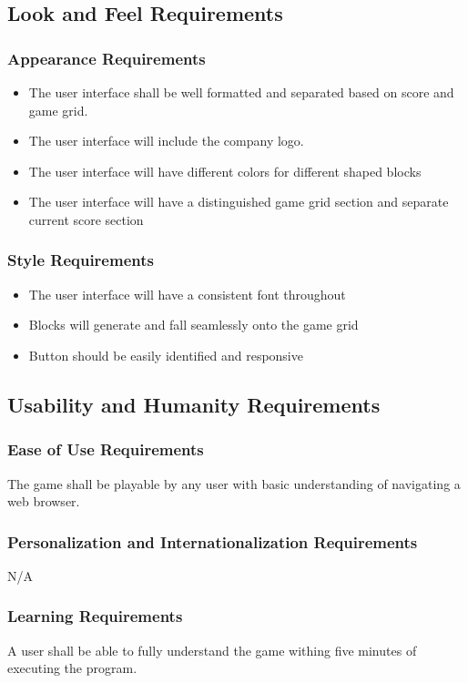 \documentclass[12pt, titlepage]{article}
\begin{document}
\subsection{Look and Feel Requirements}
\subsubsection{Appearance Requirements}
\begin{itemize}
\item The user interface shall be well formatted and separated based on score and game grid.
\item The user interface will include the company logo.
\item The user interface will have different colors for different shaped blocks
\item The user interface will have a distinguished game grid section and separate current score section
\end{itemize}
\subsubsection{Style Requirements}
\begin{itemize}
    \item The user interface will have a consistent font throughout
    \item Blocks will generate and fall seamlessly onto the game grid
    \item Button should be easily identified and responsive 
\end{itemize}

\subsection{Usability and Humanity Requirements}
\subsubsection{Ease of Use Requirements}
The game shall be playable by any user with basic understanding of navigating a web browser.
\subsubsection{Personalization and Internationalization Requirements}
N/A
\subsubsection{Learning Requirements}
A user shall be able to fully understand the game withing five minutes of executing the program.
\end{document}

